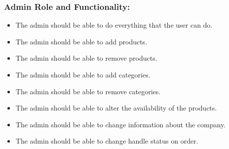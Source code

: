\subsubsection{Admin Role and Functionality:}

\begin{itemize}
    \item The admin should be able to do everything that the user can do.
    \item The admin should be able to add products.
    \item The admin should be able to remove products. 
    \item The admin should be able to add categories. 
    \item The admin should be able to remove categories. 
    \item The admin should be able to alter the availability of the products. 
    \item The admin should be able to change information about the company.
    \item The admin should be able to change handle status on order.
\end{itemize}
